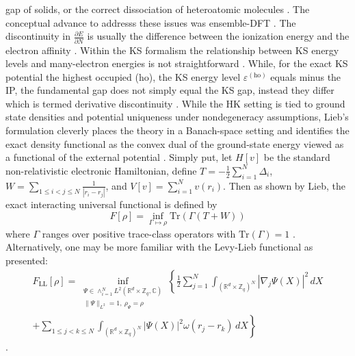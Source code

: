 \documentclass[10pt]{article}
\begin{document}
gap of solids, or the correct dissociation of heteroatomic molecules \citep{Perfetto_2012}. The conceptual advance to addresss these issues was ensemble-DFT \citep{gould2026ensemblization}. The discontinuity in $\frac{\partial E}{\partial N}$ is usually the difference between the ionization energy and the electron affinity \citep{Perfetto_2012}. Within the KS formalism the relationship between KS energy levels and many-electron energies is not straightforward \citep{kraisler2021kohn}. While, for the exact KS potential the highest occupied (ho), the KS energy level $\varepsilon^{(\text{ho})}$ equals minus the IP, the fundamental gap does not simply equal the KS gap, instead they differ which is termed derivative discontinuity \citep{kraisler2021kohn}. While the HK setting is tied to ground state densities and potential uniqueness under nondegeneracy assumptions, Lieb's formulation cleverly places the theory in a Banach-space setting and identifies the exact density functional as the convex dual of the ground-state energy viewed as a functional of the external potential \citep{sheng2026exactdensityfunctionaltheoryparallel,lieb2013current}. Simply put, let $H[v]$ be the standard non-relativistic electronic Hamiltonian, define $T = -\frac{1}{2} \sum_{i=1}^N \Delta_i$, $W = \sum_{1 \leq i < j \leq N} \frac{1}{|r_i - r_j|}$, and $V[v] = \sum_{i=1}^{N} v(r_i)$. Then as shown by Lieb, the exact interacting universal functional is defined by
\begin{equation}
F[\rho] = \inf_{\Gamma \mapsto \rho} \text{Tr}\left( \Gamma(T + W) \right)
\end{equation}
where $\Gamma$ ranges over positive trace-class operators with $\text{Tr}(\Gamma) = 1$ \citep{sheng2026exactdensityfunctionaltheoryparallel}. Alternatively, one may be more familiar with the Levy-Lieb functional as presented:
\begin{equation}
\begin{split}
F_{\text{LL}}[\rho]
= \inf_{\substack{
    \Psi \in \wedge_{i=1}^{N} L^{2}(\mathbb{R}^{d} \times \mathbb{Z}_q, \mathbb{C}) \\
    \|\Psi\|_{L^2}=1,\ \rho_\Psi = \rho
}}
\left\{
    \frac{1}{2} \sum_{j=1}^N
    \int_{(\mathbb{R}^d \times \mathbb{Z}_q)^{N}}
    |\nabla_j \Psi(X)|^2 \, dX
\right.\\
\left.
    + \sum_{1 \leq j < k \leq N}
    \int_{(\mathbb{R}^d \times \mathbb{Z}_q)^{N}}
    |\Psi(X)|^2 \omega(r_j-r_k)\, dX
\right\}
\end{split}
\end{equation}
\citep{mietzsch2020validity, levy1979universal, lieb2013current}.
\end{document}
